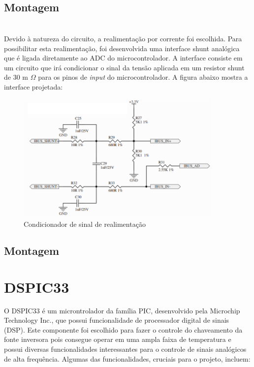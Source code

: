 \subsection{Montagem}


\section{}
\label{sec:shunt}
Devido à natureza do circuito, a realimentação por corrente foi escolhida. Para possibilitar esta realimentação, foi desenvolvida uma interface shunt analógica que é ligada diretamente ao ADC do microcontrolador. A interface consiste em um circuito que irá condicionar o sinal da tensão aplicada em um resistor shunt de 30 m $\Omega$ para os pinos de \textit{input} do microcontrolador. A figura abaixo mostra a interface projetada:

\begin{figure}[!htb]
    \centering
    \includegraphics[width=0.9\textwidth]{./dados/figuras/proj-shunt}
    \caption{Condicionador de sinal de realimentação}
    \label{fig:proj-font-inv}
\end{figure}

\subsection{Montagem}

\section{DSPIC33}
\label{sec:dsPIC}

O DSPIC33 é um microntrolador da família PIC, desenvolvido pela Microchip Technology Inc., que possui funcionalidade de processador digital de sinais (DSP). Este componente foi escolhido para fazer o controle do chaveamento da fonte inversora pois consegue operar em uma ampla faixa de temperatura e possui diversas funcionalidades interessantes para o controle de sinais analógicos de alta frequência. Algumas das funcionalidades, cruciais para o projeto, incluem:

